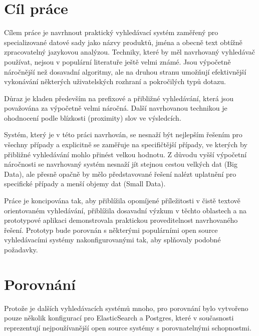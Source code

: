 \documentclass[11pt,letterpaper,oneside,openright]{book}
\begin{document}


\section{Cíl práce}
Cílem práce je navrhnout praktický vyhledávací systém zaměřený pro
specializované datové sady jako názvy produktů, jména a obecně text obtížně
zpracovatelný jazykovou analýzou. Techniky, které by měl navrhovaný vyhledávač
používat, nejsou v populární literatuře ještě velmi známé. Jsou výpočetně
náročnější než dosavadní algoritmy, ale na druhou stranu umožňují efektivnější
vykonávání některých uživatelských rozhraní a pokročilých typů dotazu.


Důraz je kladen především na prefixové a přibližné vyhledávání, která jsou
považována za výpočetně velmi náročná. Další navrhovanou technikou je
ohodnocení podle blízkosti (proximity) slov ve výsledcích.

Systém, který je v této práci navrhován, se nesnaží být nejlepším řešením pro
všechny případy a explicitně se zaměřuje na specifičtější případy, ve kterých
by přibližné vyhledávání mohlo přinést velkou hodnotu. Z důvodu vyšší výpočetní
náročnosti se navrhovaný systém nesnaží jít stejnou cestou velkých dat (Big
Data), ale přesně opačně by mělo představované řešení nalézt uplatnění pro
specifické případy a menší objemy dat (Small Data).

Práce je koncipována tak, aby přiblížila opomíjené příležitosti v čistě textově
orientovaném vyhledávání, přiblížila dosavadní výzkum v těchto oblastech a na
prototypové aplikaci demonstrovala praktickou proveditelnost navrhovaného
řešení. Prototyp bude porovnán s některými populárními open source
vyhledávacími systémy nakonfigurovanými tak, aby splňovaly podobné požadavky.

\section{Porovnání}
Protože je dalších vyhledávacích systémů mnoho, pro porovnání bylo vytvořeno
pouze několik konfigurací pro ElasticSearch a Postgres, které v současnosti
reprezentují nejpoužívanější open source systémy s porovnatelnými schopnostmi.
\end{document}
